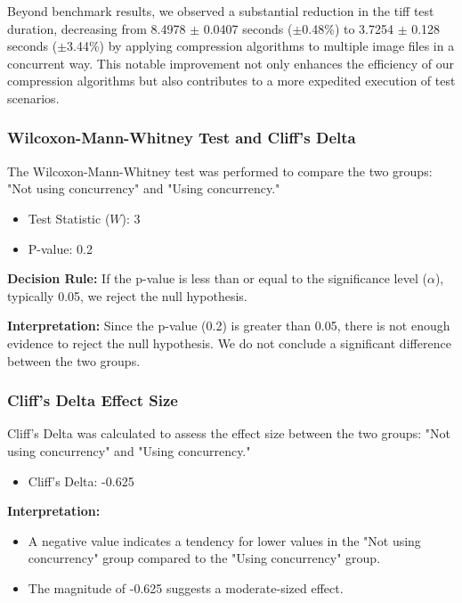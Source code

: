 \documentclass[sigconf]{acmart}
\begin{document}
\FloatBarrier
Beyond benchmark results, we observed a substantial reduction in the tiff test duration, decreasing from 8.4978 $\pm$ 0.0407 seconds ($\pm$0.48\%) to 3.7254 $\pm$ 0.128 seconds ($\pm$3.44\%) by applying compression algorithms to multiple image files in a concurrent way. This notable improvement not only enhances the efficiency of our compression algorithms but also contributes to a more expedited execution of test scenarios.

\subsubsection{Wilcoxon-Mann-Whitney Test and Cliff's Delta}

The Wilcoxon-Mann-Whitney test was performed to compare the two groups: "Not using concurrency" and "Using concurrency."

\begin{itemize}
    \item Test Statistic ($W$): 3
    \item P-value: 0.2
\end{itemize}

\textbf{Decision Rule:} If the p-value is less than or equal to the significance level (\(\alpha\)), typically 0.05, we reject the null hypothesis.

\textbf{Interpretation:} Since the p-value (0.2) is greater than 0.05, there is not enough evidence to reject the null hypothesis. We do not conclude a significant difference between the two groups.


\subsubsection{Cliff's Delta Effect Size}

Cliff's Delta was calculated to assess the effect size between the two groups: "Not using concurrency" and "Using concurrency."

\begin{itemize}
    \item Cliff's Delta: -0.625
\end{itemize}

\textbf{Interpretation:}
\begin{itemize}
    \item A negative value indicates a tendency for lower values in the "Not using concurrency" group compared to the "Using concurrency" group.
    \item The magnitude of -0.625 suggests a moderate-sized effect.
\end{itemize}
\end{document}
